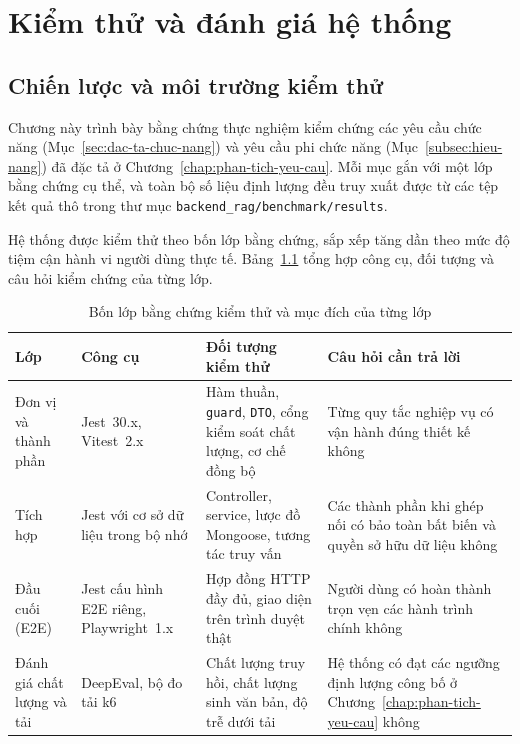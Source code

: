 
\chapter{Kiểm thử và đánh giá hệ thống}
\label{chap:kiem-thu-danh-gia}

\section{Chiến lược và môi trường kiểm thử}
\label{sec:chien-luoc-kiem-thu}

Chương này trình bày bằng chứng thực nghiệm kiểm chứng các yêu cầu chức năng (Mục~\ref{sec:dac-ta-chuc-nang}) và yêu cầu phi chức năng (Mục~\ref{subsec:hieu-nang}) đã đặc tả ở Chương~\ref{chap:phan-tich-yeu-cau}. Mỗi mục gắn với một lớp bằng chứng cụ thể, và toàn bộ số liệu định lượng đều truy xuất được từ các tệp kết quả thô trong thư mục \texttt{backend\_\allowbreak{}rag/\allowbreak{}benchmark/\allowbreak{}results}.

Hệ thống được kiểm thử theo bốn lớp bằng chứng, sắp xếp tăng dần theo mức độ tiệm cận hành vi người dùng thực tế. Bảng~\ref{tab:bon-lop-kiem-thu} tổng hợp công cụ, đối tượng và câu hỏi kiểm chứng của từng lớp.

\begin{table}[htbp]
\centering
\caption{Bốn lớp bằng chứng kiểm thử và mục đích của từng lớp}
\label{tab:bon-lop-kiem-thu}
\small
\begin{tabularx}{\textwidth}{
  >{\raggedright\arraybackslash}p{3.0cm}
  >{\raggedright\arraybackslash}p{3.0cm}
  >{\raggedright\arraybackslash}p{4.3cm}
  >{\raggedright\arraybackslash}X
}
\toprule
\textbf{Lớp} & \textbf{Công cụ} & \textbf{Đối tượng kiểm thử} & \textbf{Câu hỏi cần trả lời} \\
\midrule
Đơn vị và thành phần & Jest~30.x, Vitest~2.x & Hàm thuần, \texttt{guard}, \texttt{DTO}, cổng kiểm soát chất lượng, cơ chế đồng bộ & Từng quy tắc nghiệp vụ có vận hành đúng thiết kế không \\
\midrule
Tích hợp & Jest với cơ sở dữ liệu trong bộ nhớ & Controller, service, lược đồ Mongoose, tương tác truy vấn & Các thành phần khi ghép nối có bảo toàn bất biến và quyền sở hữu dữ liệu không \\
\midrule
Đầu cuối (E2E) & Jest cấu hình E2E riêng, Playwright~1.x & Hợp đồng HTTP đầy đủ, giao diện trên trình duyệt thật & Người dùng có hoàn thành trọn vẹn các hành trình chính không \\
\midrule
Đánh giá chất lượng và tải & DeepEval, bộ đo tải k6 & Chất lượng truy hồi, chất lượng sinh văn bản, độ trễ dưới tải & Hệ thống có đạt các ngưỡng định lượng công bố ở Chương~\ref{chap:phan-tich-yeu-cau} không \\
\bottomrule
\end{tabularx}
\end{table}


